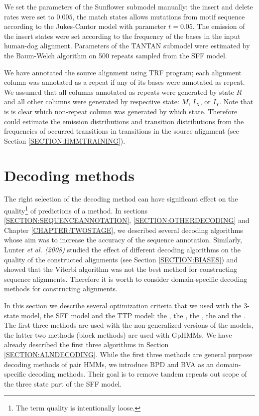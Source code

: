 We set the parameters of the Sunflower submodel manually: the insert and delete
rates were set to $0.005$, the match states allows mutations from motif
sequence according to the Jukes-Cantor model with parameter $t=0.05$. The
emission of the insert states were set according to the frequency of the bases
in the input human-dog alignment.  Parameters of the TANTAN submodel were
estimated by the Baum-Welch algorithm \cite{Durbin1998} on 500 repeats sampled
from the SFF model.

We have annotated the source alignment using TRF program; each alignment column
was annotated as a repeat if any of its bases were annotated as repeat. We
assumed that all columns annotated as repeats were generated by state $R$ and
all other columns were generated by respective state: $M$, $I_X$, or $I_Y$.
Note that is is clear which non-repeat column was generated by which state.
Therefore could estimate the emission distributions and transition
distributions from the frequencies of occurred transitions in transitions in
the source alignment (see Section \ref{SECTION:HMMTRAINING}).

\section{Decoding methods}\label{SECTION:REPDECODING}

The right selection of the decoding method can have significant effect on the
quality\footnote{The term quality is intentionally loose.} of predictions of a
method. In sections \ref{SECTION:SEQUENCEANNOTATION},
\ref{SECTION:OTHERDECODING} and Chapter \ref{CHAPTER:TWOSTAGE}, we described
several decoding algorithms whose aim was to increase the accuracy of the
sequence annotation. Similarly, Lunter {\it et al. (2008)} studied the effect
of different decoding algorithms on the quality of the constructed alignments
(see Section \ref{SECTION:BIASES}) and showed that the Viterbi algorithm was
not the best method for constructing sequence alignments. Therefore it is worth
to consider domain-specific decoding methods for constructing alignments.

In this section we describe several optimization criteria that we used with the
3-state model, the SFF model and the TTP model: the , the , the
, the  and the .
The first three methods are used with the non-generalized versions of the
models, the latter two methods (block methods) are used with GpHMMs. We have
already described the first three algorithms in Section
\ref{SECTION:ALNDECODING}. While the first three methods are general purpose
decoding methods of pair HMMs, we introduce BPD and BVA as an domain-specific
decoding methods. Their goal is to remove tandem repeats out scope of the three
state part of the SFF model.

